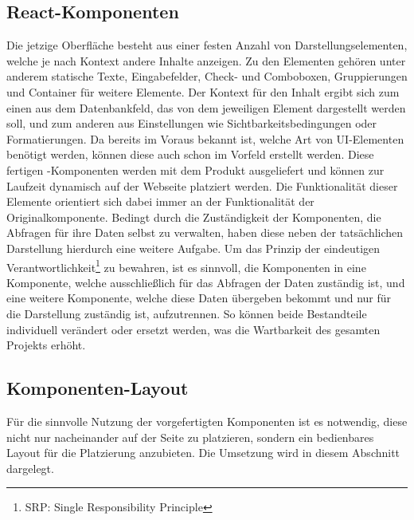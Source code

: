 \subsection{React-Komponenten}
Die jetzige Oberfläche besteht aus einer festen Anzahl von Darstellungselementen, welche je nach Kontext andere Inhalte anzeigen. Zu den Elementen gehören unter anderem statische Texte, Eingabefelder, Check- und Comboboxen, Gruppierungen und Container für weitere Elemente. Der Kontext für den Inhalt ergibt sich zum einen aus dem Datenbankfeld, das von dem jeweiligen Element dargestellt werden soll, und zum anderen aus Einstellungen wie Sichtbarkeitsbedingungen oder Formatierungen. Da bereits im Voraus bekannt ist, welche Art von UI-Elementen benötigt werden, können diese auch schon im Vorfeld erstellt werden. Diese fertigen -Komponenten werden mit dem Produkt ausgeliefert und können zur Laufzeit dynamisch auf der Webseite platziert werden. Die Funktionalität dieser Elemente orientiert sich dabei immer an der Funktionalität der Originalkomponente.
Bedingt durch die Zuständigkeit der Komponenten, die\\ Abfragen für ihre Daten selbst zu verwalten, haben diese neben der tatsächlichen Darstellung hierdurch eine weitere Aufgabe. Um das Prinzip der eindeutigen Verantwortlichkeit\footnote{SRP\@: Single Responsibility Principle} zu bewahren, ist es sinnvoll, die Komponenten in eine Komponente, welche ausschließlich für das Abfragen der Daten zuständig ist, und eine weitere Komponente, welche diese Daten übergeben bekommt und nur für die Darstellung zuständig ist, aufzutrennen. So können beide Bestandteile individuell verändert oder ersetzt werden, was die Wartbarkeit des gesamten Projekts erhöht.

\subsection{Komponenten-Layout}
Für die sinnvolle Nutzung der vorgefertigten Komponenten ist es notwendig, diese nicht nur nacheinander auf der Seite zu platzieren, sondern ein bedienbares Layout für die Platzierung anzubieten. Die Umsetzung wird in diesem Abschnitt dargelegt.

